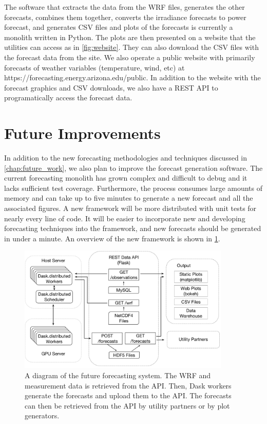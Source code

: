 The software that extracts the data from the WRF files, generates the
other forecasts, combines them together, converts the irradiance
forecasts to power forecast, and generates CSV files and plots of the
forecasts is currently a monolith written in Python.
The plots are then presented on a website that the utilities can
access as in \cref{fig:website}.
They can also download the CSV files with the forecast data from the site.
We also operate a public website with primarily forecasts of weather
variables (temperature, wind, etc) at
https://forecasting.energy.arizona.edu/public.
In addition to the website with the forecast graphics and CSV
downloads, we also have a REST API to programatically access the
forecast data.

\section{Future Improvements}
\label{sec:futurefx}

In addition to the new forecasting methodologies and techniques
discussed in \cref{chap:future_work}, we also plan to improve the
forecast generation software.
The current forecasting monolith has grown complex and difficult to
debug and it lacks sufficient test coverage.
Furthermore, the process consumes large amounts of memory and can take
up to five minutes to generate a new forecast and all the associated
figures.
A new framework will be more distributed with unit tests for nearly
every line of code.
It will be easier to incorporate new and developing
forecasting techniques into the framework, and new forecasts should be
generated in under a minute.
An overview of the new framework is shown in \cref{fig:nabu}.

\begin{figure}[htb]
\centering
\includegraphics[width=0.9\textwidth]{figs/nabudiagram.pdf}
\caption[Diagram of the future forecasting system]{A diagram of the
future forecasting system. The WRF and measurement data is retrieved
from the API. Then, Dask workers generate the forecasts and upload
them to the API. The forecasts can then be retrieved from the API by
utility partners or by plot generators.}
\label{fig:nabu}
\end{figure}

